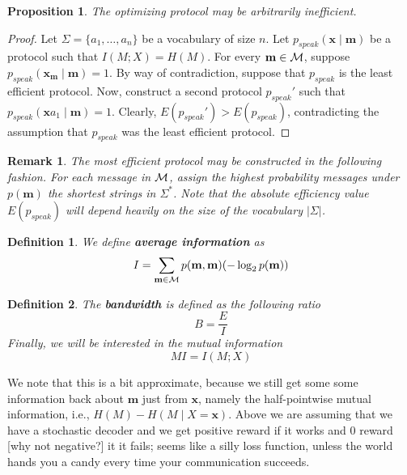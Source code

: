 \documentclass[11pt,a4paper]{article}
\newtheorem{prop}{Proposition}
\newtheorem{remark}{Remark}
\newtheorem{definition}{Definition}
\newcommand{\xx}{\mathbf{x}}
\newcommand{\mm}{\mathbf{m}}
\newcommand{\pspeak}{p_{\textit{speak}}}
\newcommand{\defn}[1]{\textbf{#1}}
\newcommand{\calM}{{\cal M}}
\begin{document}
\begin{prop}
The optimizing protocol may be arbitrarily 
inefficient. 
\end{prop}
\begin{proof}
Let $\Sigma = \{a_1, \ldots, a_n\}$ be a vocabulary of size $n$. Let $\pspeak(\xx \mid \mm)$ be a protocol such that $I(M; X) = H(M)$. For every $\mm \in \calM$, suppose $\pspeak(\xx_\mm \mid \mm) = 1$. By way of contradiction, suppose that $\pspeak$ is the least efficient protocol. Now, construct a
second protocol $\pspeak'$ such that $\pspeak(\xx a_1 \mid \mm) =1$. Clearly, $E(\pspeak') > E(\pspeak)$, contradicting the assumption that $\pspeak$ was the least efficient protocol. 
\end{proof}

\begin{remark}
The most efficient protocol may be constructed in the following fashion. For each message in $\calM$, assign the highest probability messages under $p(\mm)$ the shortest strings in $\Sigma^*$. Note that the absolute efficiency value $E(\pspeak)$ will depend heavily on the size of the vocabulary $|\Sigma|$. 
\end{remark}
\begin{definition}
We define \defn{average information} as
\begin{equation}
I = \sum_{\mm \in \calM} p(\mm,\mm) (-\log_2 p(\mm)) 
\end{equation}
\end{definition}

\begin{definition}
The \defn{bandwidth} is defined as the following 
ratio
\begin{equation}
    \textit{B} = \frac{\textit{E}}{\textit{I}}
\end{equation}
Finally, we will be interested in the mutual information
\begin{equation}
\textit{MI} = I(M; X)
\end{equation}
\end{definition}
We note that this is a bit approximate, because we still get some some information back about $\mm$ just from $\xx$, namely the half-pointwise mutual information, i.e., $H(M) - H(M \mid X=\xx)$.  Above we are assuming that we have a stochastic decoder and we get positive reward if it works and 0 reward [why not negative?] it it fails; seems like a silly loss function, unless the world hands you a candy every time your communication succeeds.
\end{document}
